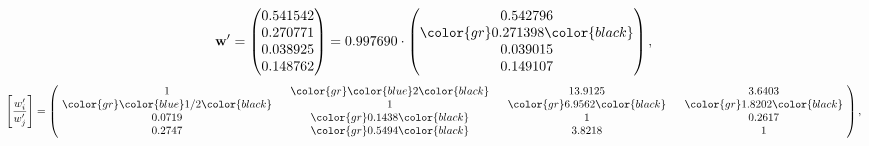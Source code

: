 \begin{example}
\begin{equation*}
\mathbf{w}^{\prime} =
\begin{pmatrix}
0.541542\\
0.270771\\
0.038925\\
0.148762
\end{pmatrix} =
0.997690\cdot
\begin{pmatrix}
0.542796\\
\color{gr} 0.271398\color{black} \\
0.039015\\
0.149107
\end{pmatrix},
\end{equation*}
\begin{equation*}
\left[ \frac{{w}^{\prime}_i}{{w}^{\prime}_j} \right] =
\begin{pmatrix}
$\,\,$ 1 $\,\,$ & $\,\,$\color{gr} \color{blue} 2\color{black} $\,\,$ & $\,\,$13.9125$\,\,$ & $\,\,$3.6403$\,\,$ \\
$\,\,$\color{gr} \color{blue}  1/2\color{black} $\,\,$ & $\,\,$ 1 $\,\,$ & $\,\,$\color{gr} 6.9562\color{black} $\,\,$ & $\,\,$\color{gr} 1.8202\color{black}   $\,\,$ \\
$\,\,$0.0719$\,\,$ & $\,\,$\color{gr} 0.1438\color{black} $\,\,$ & $\,\,$ 1 $\,\,$ & $\,\,$0.2617 $\,\,$ \\
$\,\,$0.2747$\,\,$ & $\,\,$\color{gr} 0.5494\color{black} $\,\,$ & $\,\,$3.8218$\,\,$ & $\,\,$ 1  $\,\,$ \\
\end{pmatrix},
\end{equation*}
\end{example}
\newpage
